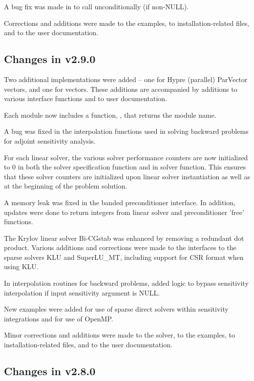 A bug fix was made in  to call  unconditionally
(if non-NULL).

Corrections and additions were made to the examples,
to installation-related files,
and to the user documentation.


\subsection*{Changes in v2.9.0}

Two additional {\nvector} implementations were added -- one for
Hypre (parallel) ParVector vectors, and one for {\petsc} vectors.  These
additions are accompanied by additions to various interface functions
and to user documentation.

Each {\nvector} module now includes a function, ,
that returns the {\nvector} module name.

A bug was fixed in the interpolation functions used in solving
backward problems for adjoint sensitivity analysis.

For each linear solver, the various solver performance counters are
now initialized to 0 in both the solver specification function and in
solver  function.  This ensures that these solver counters
are initialized upon linear solver instantiation as well as at the
beginning of the problem solution.

A memory leak was fixed in the banded preconditioner interface.
In addition, updates were done to return integers from linear solver
and preconditioner 'free' functions.

The Krylov linear solver Bi-CGstab was enhanced by removing a redundant
dot product.  Various additions and corrections were made to the
interfaces to the sparse solvers KLU and SuperLU\_MT, including support
for CSR format when using KLU.

In interpolation routines for backward problems, added logic to bypass
sensitivity interpolation if input sensitivity argument is NULL.

New examples were added for use of sparse direct solvers within sensitivity
integrations and for use of OpenMP.

Minor corrections and additions were made to the {\cvodes} solver, to the
examples, to installation-related files,
and to the user documentation.

\subsection*{Changes in v2.8.0}

